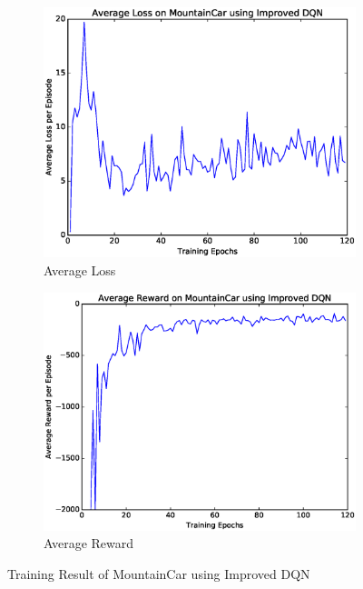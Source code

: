 \documentclass[a4paper,UTF8]{article}
\theoremstyle{definition}
\begin{document}
\begin{figure}[htbp]
	\centering
	\begin{subfigure}[t]{0.5\textwidth}
		\centering
		\includegraphics[scale=0.35]{figures/car-idqn-loss}
		\caption{Average Loss}
	\end{subfigure}%
	\begin{subfigure}[t]{0.5\textwidth}
		\centering
		\includegraphics[scale=0.35]{figures/car-idqn-reward}
		\caption{Average Reward}
	\end{subfigure}
	\caption{Training Result of MountainCar using Improved DQN}\label{fig:car-idqn}
\end{figure}
\end{document}
